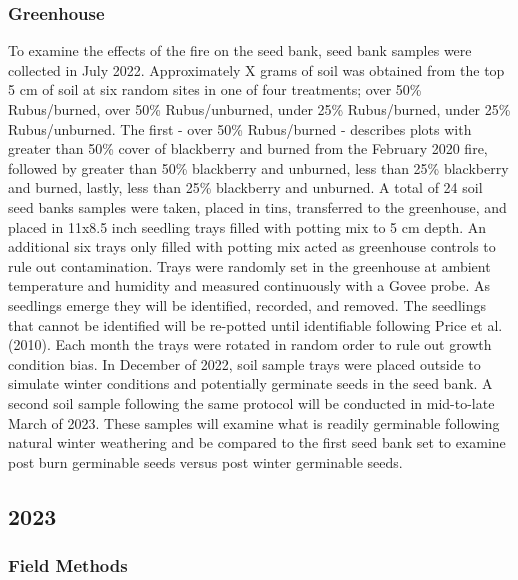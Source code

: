 \documentclass[
]{article}
\begin{document}
\hypertarget{greenhouse}{%
\subsubsection{Greenhouse}\label{greenhouse}}

To examine the effects of the fire on the seed bank, seed bank samples were collected in July 2022. Approximately X grams of soil was obtained from the top 5 cm of soil at six random sites in one of four treatments; over 50\% Rubus/burned, over 50\% Rubus/unburned, under 25\% Rubus/burned, under 25\% Rubus/unburned. The first - over 50\% Rubus/burned - describes plots with greater than 50\% cover of blackberry and burned from the February 2020 fire, followed by greater than 50\% blackberry and unburned, less than 25\% blackberry and burned, lastly, less than 25\% blackberry and unburned. A total of 24 soil seed banks samples were taken, placed in tins, transferred to the greenhouse, and placed in 11x8.5 inch seedling trays filled with potting mix to 5 cm depth. An additional six trays only filled with potting mix acted as greenhouse controls to rule out contamination. Trays were randomly set in the greenhouse at ambient temperature and humidity and measured continuously with a Govee probe. As seedlings emerge they will be identified, recorded, and removed. The seedlings that cannot be identified will be re-potted until identifiable following Price et al. (2010). Each month the trays were rotated in random order to rule out growth condition bias. In December of 2022, soil sample trays were placed outside to simulate winter conditions and potentially germinate seeds in the seed bank. A second soil sample following the same protocol will be conducted in mid-to-late March of 2023. These samples will examine what is readily germinable following natural winter weathering and be compared to the first seed bank set to examine post burn germinable seeds versus post winter germinable seeds.

\hypertarget{section-1}{%
\subsection{2023}\label{section-1}}

\hypertarget{field-methods-1}{%
\subsubsection{Field Methods}\label{field-methods-1}}
\end{document}
